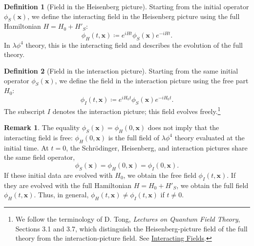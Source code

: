 \documentclass[11pt,letterpaper]{article}
\theoremstyle{definition}
\newtheorem{definicion}{Definition}
\theoremstyle{definition}
\newtheorem{observacion}{Remark}
\newcommand{\eqbox}[1]{\boxed{\displaystyle #1}}
\begin{document}
\begin{definicion}[Field in the Heisenberg picture]
Starting from the initial operator $\phi_S(\mathbf{x})$, we define the
interacting field in the Heisenberg picture using the full Hamiltonian
$H=H_0+H'_S$:
\begin{equation}
  \eqbox{\phi_H(t,\mathbf{x})\coloneqq
    e^{iHt}\phi_S(\mathbf{x})e^{-iHt}.}
  \label{eq:fieldHeisenberg}
\end{equation}
In $\lambda\phi^4$ theory, this is the interacting field and describes
the evolution of the full theory.
\end{definicion}

\begin{definicion}[Field in the interaction picture]
Starting from the same initial operator $\phi_S(\mathbf{x})$, we define
the field in the interaction picture using the free part $H_0$:
\begin{equation}
  \eqbox{\phi_I(t,\mathbf{x})\coloneqq
    e^{iH_0t}\phi_S(\mathbf{x})e^{-iH_0t}.}
  \label{eq:fieldInteraction}
\end{equation}
The subscript $I$ denotes the interaction picture; this field evolves
freely.\footnote{We follow the terminology of D. Tong,
\emph{Lectures on Quantum Field Theory}, Sections 3.1 and 3.7, which
distinguish the Heisenberg-picture field of the full theory from the
interaction-picture field. See
\href{https://www.damtp.cam.ac.uk/user/tong/qft/qfthtml/S3.html}{Interacting Fields}.}
\end{definicion}

\begin{observacion}
The equality \(\phi_S(\mathbf{x})=\phi_H(0,\mathbf{x})\) does not imply
that the interacting field is free: \(\phi_H(0,\mathbf{x})\) is the full
field of \(\lambda\phi^4\) theory evaluated at the initial time. At \(t=0\),
the Schrödinger, Heisenberg, and interaction pictures share the same
field operator,
\begin{equation}
  \phi_S(\mathbf{x})=\phi_H(0,\mathbf{x})=\phi_I(0,\mathbf{x}).
\end{equation}
If these initial data are evolved with \(H_0\), we obtain the free field
\(\phi_I(t,\mathbf{x})\). If they are evolved with the full Hamiltonian
\(H=H_0+H'_S\), we obtain the full field \(\phi_H(t,\mathbf{x})\). Thus,
in general, \(\phi_H(t,\mathbf{x})\neq\phi_I(t,\mathbf{x})\) if \(t\neq0\).
\end{observacion}
\end{document}
